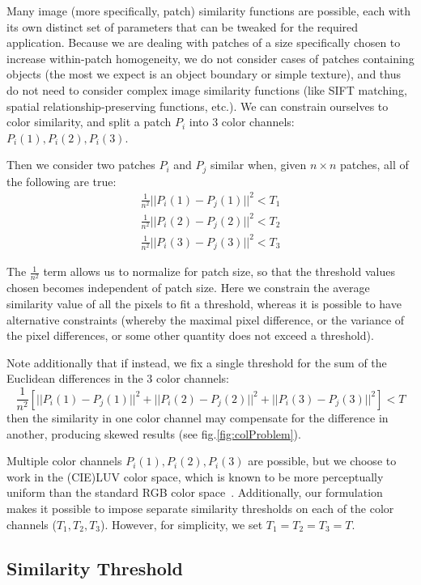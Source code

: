 Many image (more specifically, patch) similarity functions are possible, each with its own distinct set of parameters that can be tweaked for the required application. Because we are dealing with patches of a size specifically chosen to increase within-patch homogeneity, we do not consider cases of patches containing objects (the most we expect is an object boundary or simple texture), and thus do not need to consider complex image similarity functions (like SIFT matching, spatial relationship-preserving functions, etc.). We can constrain ourselves to color similarity, and split a patch $P_i$ into 3 color channels: $P_i(1), P_i(2), P_i(3)$. 

Then we consider two patches $P_i$ and $P_j$ similar when, given $n\times n$ patches, all of the following are true:
\begin{align*}
\frac{1}{n^2}||P_i(1) - P_j(1)||^2 < T_1 \\
\frac{1}{n^2}||P_i(2) - P_j(2)||^2 < T_2 \\
\frac{1}{n^2}||P_i(3) - P_j(3)||^2 < T_3
\end{align*}

The $\frac{1}{n^2}$ term allows us to normalize for patch size, so that the threshold values chosen becomes independent of patch size. Here we constrain the average similarity value of all the pixels to fit a threshold, whereas it is possible to have alternative constraints (whereby the maximal pixel difference, or the variance of the pixel differences, or some other quantity does not exceed a threshold).

Note additionally that if instead, we fix a single threshold for the sum of the Euclidean differences in the 3 color channels: 
\begin{displaymath}
\frac{1}{n^2}[||P_i(1) - P_j(1)||^2 + ||P_i(2) - P_j(2)||^2 + ||P_i(3) - P_j(3)||^2] < T
\end{displaymath}
then the similarity in one color channel may compensate for the difference in another, producing skewed results (see fig.\ref{fig:colProblem}).

Multiple color channels $P_i(1), P_i(2), P_i(3)$ are possible, but we choose to work in the (CIE)LUV color space, which is known to be more perceptually uniform than the standard RGB color space~\cite{kekre2012performance}. Additionally, our formulation makes it possible to impose separate similarity thresholds on each of the color channels ($T_1,T_2,T_3$). However, for simplicity, we set $T_1=T_2=T_3=T$.

\subsection{Similarity Threshold}

